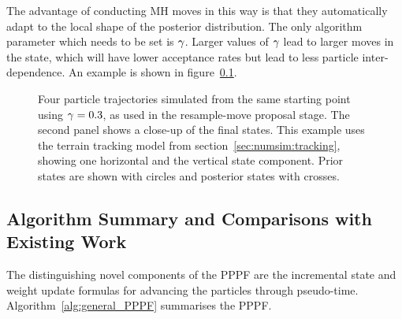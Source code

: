 \documentclass{article}
\begin{document}
The advantage of conducting MH moves in this way is that they automatically adapt to the local shape of the posterior distribution. The only algorithm parameter which needs to be set is $\gamma$. Larger values of $\gamma$ lead to larger moves in the state, which will have lower acceptance rates but lead to less particle inter-dependence. An example is shown in figure~\ref{}.
%
\begin{figure}
\centering
{}
\caption{Four particle trajectories simulated from the same starting point using $\gamma=0.3$, as used in the resample-move proposal stage. The second panel shows a close-up of the final states. This example uses the terrain tracking model from section~\ref{sec:numsim:tracking}, showing one horizontal and the vertical state component. Prior states are shown with circles and posterior states with crosses.}
\label{fig:drone_example_frame_deterministic}
\end{figure}



\subsection{Algorithm Summary and Comparisons with Existing Work}

The distinguishing novel components of the PPPF are the incremental state and weight update formulas for advancing the particles through pseudo-time. Algorithm~\ref{alg:general_PPPF} summarises the PPPF.
\end{document}
